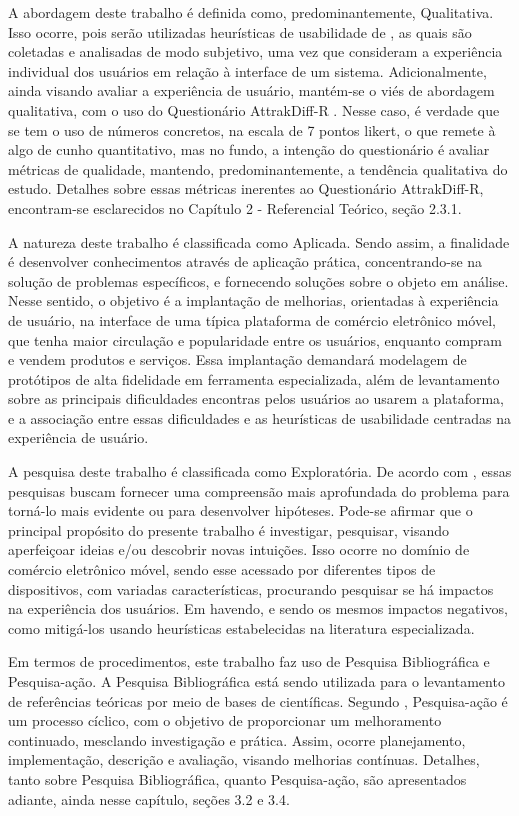 A abordagem deste trabalho é definida como, predominantemente, Qualitativa. Isso ocorre, pois serão utilizadas heurísticas de usabilidade de \cite{NNGroupUI}, as quais são coletadas e analisadas de modo subjetivo, uma vez que consideram a experiência individual dos usuários em relação à interface de um sistema. Adicionalmente, ainda visando avaliar a experiência de usuário, mantém-se o viés de abordagem qualitativa, com o uso do Questionário AttrakDiff-R \cite{AttrakDiff}. Nesse caso, é verdade que se tem o uso de números concretos, na escala de 7 pontos likert, o que remete à algo de cunho quantitativo, mas no fundo, a intenção do questionário é avaliar métricas de qualidade, mantendo, predominantemente, a tendência qualitativa do estudo. Detalhes sobre essas métricas inerentes ao Questionário AttrakDiff-R, encontram-se esclarecidos no Capítulo 2 - Referencial Teórico, seção 2.3.1.

A natureza deste trabalho é classificada como Aplicada. Sendo assim, a finalidade é desenvolver conhecimentos através de aplicação prática, concentrando-se na solução de problemas específicos, e fornecendo soluções sobre o objeto em análise. Nesse sentido, o objetivo é a implantação de melhorias, orientadas à experiência de usuário, na interface de uma típica plataforma de comércio eletrônico móvel, que tenha maior circulação e popularidade entre os usuários, enquanto compram e vendem produtos e serviços. Essa implantação demandará modelagem de protótipos de alta fidelidade em ferramenta especializada, além de levantamento sobre as principais dificuldades encontras pelos usuários ao usarem a plataforma, e a associação entre essas dificuldades e as heurísticas de usabilidade centradas na experiência de usuário.

A pesquisa deste trabalho é classificada como Exploratória. De acordo com , essas pesquisas buscam fornecer uma compreensão mais aprofundada do problema para torná-lo mais evidente ou para desenvolver hipóteses. Pode-se afirmar que o principal propósito do presente trabalho é investigar, pesquisar, visando aperfeiçoar ideias e/ou descobrir novas intuições. Isso ocorre no domínio de comércio eletrônico móvel, sendo esse acessado por diferentes tipos de dispositivos, com variadas características, procurando pesquisar se há impactos na experiência dos usuários. Em havendo, e sendo os mesmos impactos negativos, como mitigá-los usando heurísticas estabelecidas na literatura especializada.

Em termos de procedimentos, este trabalho faz uso de Pesquisa Bibliográfica e Pesquisa-ação. A Pesquisa Bibliográfica está sendo utilizada para o levantamento de referências teóricas por meio de bases de científicas. Segundo , Pesquisa-ação é um processo cíclico, com o objetivo de proporcionar um melhoramento continuado, mesclando investigação e prática. Assim, ocorre planejamento, implementação, descrição e avaliação, visando melhorias contínuas. Detalhes, tanto sobre Pesquisa Bibliográfica, quanto Pesquisa-ação, são apresentados adiante, ainda nesse capítulo, seções 3.2 e 3.4.

